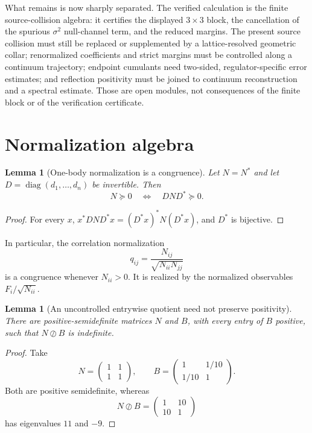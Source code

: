 \documentclass[11pt]{article}
\newtheorem{lemma}[theorem]{Lemma}
\newcommand{\diag}{\operatorname{diag}}
\newcommand{\odiv}{\oslash}
\begin{document}
What remains is now sharply separated.  The verified calculation is the finite source-collision algebra: it certifies the displayed $3\times3$ block, the cancellation of the spurious $\sigma^2$ null-channel term, and the reduced margins.  The present source collision must still be replaced or supplemented by a lattice-resolved geometric collar; renormalized coefficients and strict margins must be controlled along a continuum trajectory; endpoint cumulants need two-sided, regulator-specific error estimates; and reflection positivity must be joined to continuum reconstruction and a spectral estimate.  Those are open modules, not consequences of the finite block or of the verification certificate.

\appendix

\section{Normalization algebra}
\label{app:normalization}

\begin{lemma}[One-body normalization is a congruence]
Let $N=N^*$ and let $D=\diag(d_1,\ldots,d_n)$ be invertible.  Then
\[
  N\succeq0
  \quad\Longleftrightarrow\quad
  DND^*\succeq0.
\]
\end{lemma}

\begin{proof}
For every $x$, $x^*DND^*x=(D^*x)^*N(D^*x)$, and $D^*$ is bijective.
\end{proof}

In particular, the correlation normalization
\[
  q_{ij}=\frac{N_{ij}}{\sqrt{N_{ii}N_{jj}}}
\]
is a congruence whenever $N_{ii}>0$.  It is realized by the normalized observables $F_i/\sqrt{N_{ii}}$.

\begin{lemma}[An uncontrolled entrywise quotient need not preserve positivity]
There are positive-semidefinite matrices $N$ and $B$, with every entry of $B$ positive, such that $N\odiv B$ is indefinite.
\end{lemma}

\begin{proof}
Take
\[
  N=\begin{pmatrix}1&1\\1&1\end{pmatrix},
  \qquad
  B=\begin{pmatrix}1&1/10\\1/10&1\end{pmatrix}.
\]
Both are positive semidefinite, whereas
\[
  N\odiv B=\begin{pmatrix}1&10\\10&1\end{pmatrix}
\]
has eigenvalues $11$ and $-9$.
\end{proof}
\end{document}
